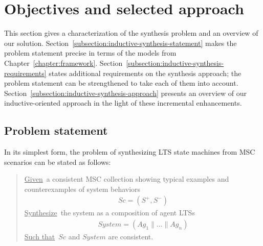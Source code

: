 \section{Objectives and selected approach\label{section:inductive-objectives-and-approach}}

This section gives a characterization of the synthesis problem and an overview of our solution. Section~\ref{subsection:inductive-synthesis-statement} makes the problem statement precise in terms of the models from Chapter~\ref{chapter:framework}. Section~\ref{subsection:inductive-synthesis-requirements} states additional requirements on the synthesis approach; the problem statement can be strengthened to take each of them into account. Section~\ref{subsection:inductive-synthesis-approach} presents an overview of our inductive-oriented approach in the light of these incremental enhancements.


\subsection{Problem statement\label{subsection:inductive-synthesis-statement}}

In its simplest form, the problem of synthesizing LTS state machines from MSC scenarios can be stated as follows:

\begin{quote}
\underline{Given}~a consistent MSC collection showing typical examples and counterexamples of system behaviors
\begin{align*}
Sc = (S^+,S^-)
\end{align*}
\underline{Synthesize}~the system as a composition of agent LTSs
\begin{align*}
System = (Ag_1 \parallel \ldots \parallel Ag_n)
\end{align*}
\underline{Such that}~$Sc$ and $System$ are consistent.
\end{quote}


